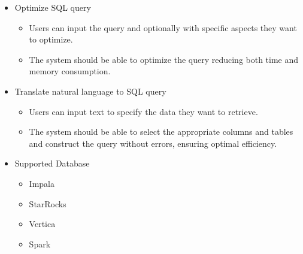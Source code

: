 \begin{itemize}
        \item Optimize SQL query
        \begin{itemize}
            \item Users can input the query and optionally with specific aspects they want to optimize.
            \item The system should be able to optimize the query reducing both time and memory consumption.
        \end{itemize}
        \item Translate natural language to SQL query
        \begin{itemize}
            \item Users can input text to specify the data they want to retrieve.
            \item The system should be able to select the appropriate columns and tables and construct the query without errors, ensuring optimal efficiency.
        \end{itemize}
        \item Supported Database
        \begin{itemize}
            \item Impala
            \item StarRocks
            \item Vertica
            \item Spark
        \end{itemize}
    \end{itemize}
